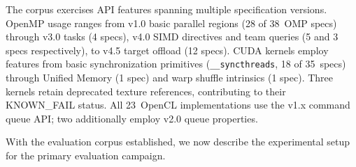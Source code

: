 The corpus exercises API features spanning multiple specification versions. OpenMP usage ranges from v1.0 basic parallel regions (28 of 38~OMP specs) through v3.0 tasks (4 specs), v4.0 SIMD directives and team queries (5 and 3 specs respectively), to v4.5 target offload (12 specs). CUDA kernels employ features from basic synchronization primitives (\texttt{\_\_syncthreads}, 18 of 35~specs) through Unified Memory (1 spec) and warp shuffle intrinsics (1 spec). Three kernels retain deprecated texture references, contributing to their KNOWN\_FAIL status. All 23~OpenCL implementations use the v1.x command queue API; two additionally employ v2.0 queue properties.

With the evaluation corpus established, we now describe the experimental setup for the primary evaluation campaign.


